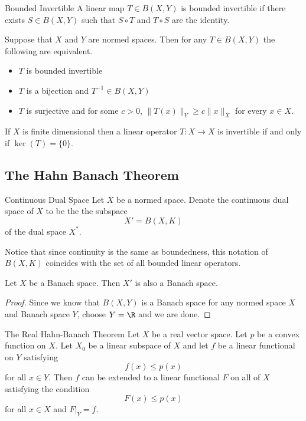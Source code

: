 \documentclass[a4paper]{article}
\begin{document}
\begin{defn}{Bounded Invertible}{} A linear map $T\in B(X,Y)$ is bounded invertible if there exists $S\in B(X,Y)$ such that $S\circ T$ and $T\circ S$ are the identity. 
\end{defn}

\begin{lmm}{}{} Suppose that $X$ and $Y$ are normed spaces. Then for any $T\in B(X,Y)$ the following are equivalent. 
\begin{itemize}
\item $T$ is bounded invertible
\item $T$ is a bijection and $T^{-1}\in B(X,Y)$
\item $T$ is surjective and for some $c>0$, $\|T(x)\|_Y\geq c\|x\|_X$ for every $x\in X$. 
\end{itemize}
\end{lmm}

\begin{crl}{}{} If $X$ is finite dimensional then a linear operator $T:X\to X$ is invertible if and only if $\ker(T)=\{0\}$. 
\end{crl}

\subsection{The Hahn Banach Theorem}
\begin{defn}{Continuous Dual Space}{} Let $X$ be a normed space. Denote the continuous dual space of $X$ to be the the subspace $$X'=B(X,K)$$ of the dual space $X^\ast$. 
\end{defn}

Notice that since continuity is the same as boundedness, this notation of $B(X,K)$ coincides with the set of all bounded linear operators. 

\begin{lmm}{}{} Let $X$ be a Banach space. Then $X'$ is also a Banach space. \tcbline
\begin{proof}
Since we know that $B(X,Y)$ is a Banach space for any normed space $X$ and Banach space $Y$, choose $Y=\R$ and we are done. 
\end{proof}
\end{lmm}

\begin{thm}{The Real Hahn-Banach Theorem}{} Let $X$ be a real vector space. Let $p$ be a convex function on $X$. Let $X_0$ be a linear subspace of $X$ and let $f$ be a linear functional on $Y$ satisfying $$f(x)\leq p(x)$$ for all $x\in Y$. Then $f$ can be extended to a linear functional $F$ on all of $X$ satisfying the condition $$F(x)\leq p(x)$$ for all $x\in X$ and $F|_Y=f$. 
\end{thm}
\end{document}
